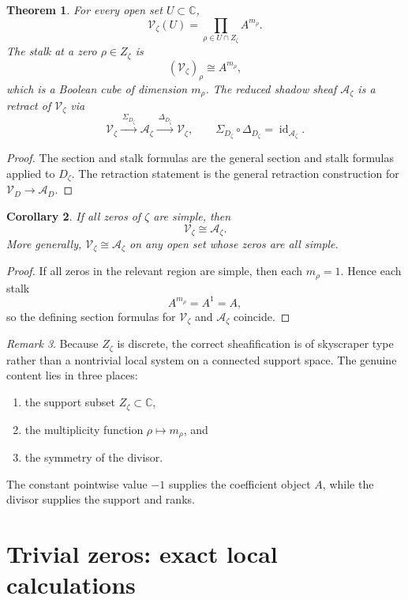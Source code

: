 \documentclass[11pt,a4paper]{article}
\newtheorem{theorem}{Theorem}[section]
\newtheorem{corollary}[theorem]{Corollary}
\theoremstyle{definition}
\theoremstyle{remark}
\newtheorem{remark}[theorem]{Remark}
\newcommand{\CC}{\mathbb C}
\begin{document}
\begin{theorem}
For every open set \(U\subset\CC\),
\[
\mathcal V_\zeta(U)=\prod_{\rho\in U\cap Z_\zeta}A^{m_\rho}.
\]
The stalk at a zero \(\rho\in Z_\zeta\) is
\[
(\mathcal V_\zeta)_\rho\cong A^{m_\rho},
\]
which is a Boolean cube of dimension \(m_\rho\). The reduced shadow sheaf \(\mathcal A_\zeta\) is a retract of \(\mathcal V_\zeta\) via
\[
\mathcal V_\zeta\xrightarrow{\ \Sigma_{D_\zeta}\ }\mathcal A_\zeta
\xrightarrow{\ \Delta_{D_\zeta}\ }\mathcal V_\zeta,
\qquad
\Sigma_{D_\zeta}\circ\Delta_{D_\zeta}=\operatorname{id}_{\mathcal A_\zeta}.
\]
\end{theorem}

\begin{proof}
The section and stalk formulas are the general section and stalk formulas applied to \(D_\zeta\). The retraction statement is the general retraction construction for \(\mathcal V_D\to\mathcal A_D\).
\end{proof}

\begin{corollary}
If all zeros of \(\zeta\) are simple, then
\[
\mathcal V_\zeta\cong \mathcal A_\zeta.
\]
More generally, \(\mathcal V_\zeta\cong\mathcal A_\zeta\) on any open set whose zeros are all simple.
\end{corollary}

\begin{proof}
If all zeros in the relevant region are simple, then each \(m_\rho=1\). Hence each stalk
\[
A^{m_\rho}=A^1=A,
\]
so the defining section formulas for \(\mathcal V_\zeta\) and \(\mathcal A_\zeta\) coincide.
\end{proof}

\begin{remark}
Because \(Z_\zeta\) is discrete, the correct sheafification is of skyscraper type rather than a nontrivial local system on a connected support space. The genuine content lies in three places:
\begin{enumerate}[label=(\roman*)]
\item the support subset \(Z_\zeta\subset\CC\),
\item the multiplicity function \(\rho\mapsto m_\rho\), and
\item the symmetry of the divisor.
\end{enumerate}
The constant pointwise value \(-1\) supplies the coefficient object \(A\), while the divisor supplies the support and ranks.
\end{remark}

\section{Trivial zeros: exact local calculations}
\end{document}
